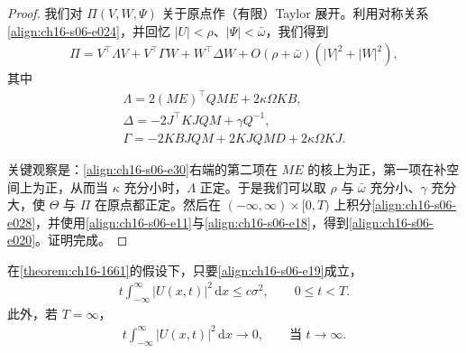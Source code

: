 \documentclass[../../main.tex]{subfiles}
\begin{document}
\begin{proof}
我们对 $\Pi(V,W,\Psi)$ 关于原点作（有限）Taylor 展开。利用对称关系\eqref{align:ch16-s06-e024}，并回忆 $|U|<\rho$、$|\Psi|<\bar\omega$，我们得到
\begin{align}
\Pi=V^\top\Lambda V+V^\top\Gamma W+W^\top\Delta W+O(\rho+\bar\omega)(|V|^2+|W|^2),
\label{align:ch16-s06-e029}
\end{align}
其中
\begin{align}
\Lambda=2(ME)^\top QME+2\kappa\Omega KB,
\label{align:ch16-s06-e30}\\
\Delta=-2J^\top KJQM+\gamma Q^{-1},
\label{align:ch16-s06-e31}\\
\Gamma=-2KBJQM+2KJQMD+2\kappa\Omega KJ.
\label{align:ch16-s06-e32}
\end{align}

关键观察是：\eqref{align:ch16-s06-e30}右端的第二项在 $ME$ 的核上为正，第一项在补空间上为正，从而当 $\kappa$ 充分小时，$\Lambda$ 正定。于是我们可以取 $\rho$ 与 $\bar\omega$ 充分小、$\gamma$ 充分大，使 $\Theta$ 与 $\Pi$ 在原点都正定。然后在 $(-\infty,\infty)\times[0,T)$ 上积分\eqref{align:ch16-s06-e028}，并使用\eqref{align:ch16-s06-e11}与\eqref{align:ch16-s06-e18}，得到\eqref{align:ch16-s06-e020}。证明完成。
\end{proof}

\begin{lemma}\label{lemma:ch16-1663}
在\cref{theorem:ch16-1661}的假设下，只要\eqref{align:ch16-s06-e19}成立，
\begin{align}
t\int_{-\infty}^{\infty}|U(x,t)|^2\,\mathrm{d}x\leqslant c\sigma^2,\qquad 0\leqslant t<T.
\label{align:ch16-s06-e33}
\end{align}
此外，若 $T=\infty$，
\begin{align}
t\int_{-\infty}^{\infty}|U(x,t)|^2\,\mathrm{d}x\to0,\qquad\text{当 }t\to\infty.
\label{align:ch16-s06-e34}
\end{align}
\end{lemma}
\end{document}
